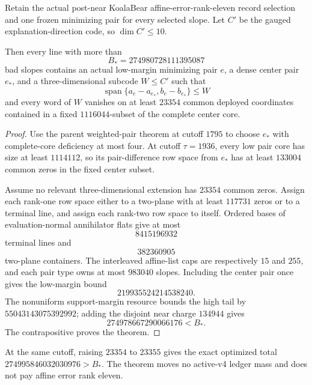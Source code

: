 
\begin{theorem}
\label{thm:kb-rank11-factor-flag-router}
Retain the actual post-near KoalaBear affine-error-rank-eleven record selection
and one frozen minimizing pair for every selected slope.  Let $C'$ be the
gauged explanation-direction code, so $\dim C'\le10$.

Then every line with more than
\[
 B_*=274980728111395087
\]
bad slopes contains an actual low-margin minimizing pair $e$, a dense center
pair $e_*$, and a three-dimensional subcode $W\le C'$ such that
\[
 \operatorname{span}\{a_e-a_{e_*},b_e-b_{e_*}\}\le W
\]
and every word of $W$ vanishes on at least $23354$ common deployed
coordinates contained in a fixed $1116044$-subset of the complete center
core.
\end{theorem}

\begin{proof}
Use the parent weighted-pair theorem at cutoff $1795$ to choose $e_*$ with
complete-core deficiency at most four.  At cutoff $\tau=1936$, every low pair
core has size at least $1114112$, so its pair-difference row space from $e_*$
has at least $133004$ common zeros in the fixed center subset.

Assume no relevant three-dimensional extension has $23354$ common zeros.
Assign each rank-one row space either to a two-plane with at least $117731$
zeros or to a terminal line, and assign each rank-two row space to itself.
Ordered bases of evaluation-normal annihilator flats give at most
\[
 8415196932
\]
terminal lines and
\[
 382360905
\]
two-plane containers.  The interleaved affine-list caps are respectively
$15$ and $255$, and each pair type owns at most $983040$ slopes.  Including
the center pair once gives the low-margin bound
\[
 219935524214538240.
\]
The nonuniform support-margin resource bounds the high tail by
$55043143075392992$; adding the disjoint near charge $134944$ gives
\[
 274978667290066176<B_*.
\]
The contrapositive proves the theorem.
\end{proof}

\begin{remark}
At the same cutoff, raising $23354$ to $23355$ gives the exact optimized total
$274995846032030976>B_*$.  The theorem moves no active-v4 ledger mass and
does not pay affine error rank eleven.
\end{remark}
